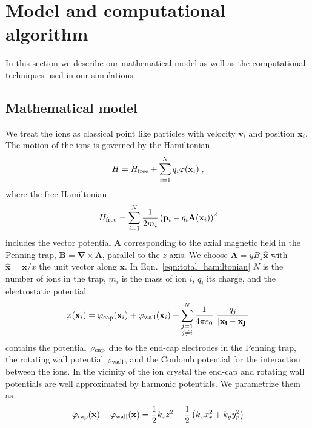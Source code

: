 \documentclass[aps, pra, preprint]{revtex4-1}
\newcommand{\hfree}{H_{\rm free}}
\newcommand{\phicap}{\varphi_{\rm cap}}
\newcommand{\phiwall}{\varphi_{\rm wall}}
\begin{document}
\section{Model and computational algorithm}
\label{sec:model}

In this section we describe our mathematical model as well as the
computational techniques used in our simulations.


\subsection{Mathematical model}

We treat the ions as classical point like particles with 
velocity $\mathbf{v}_i$ and position $\mathbf{x}_i$. The motion
of the ions is governed by the Hamiltonian
\begin{equation}
  H = \hfree + \sum_{i=1}^N q_i\varphi(\mathbf{x}_i)\;,
\end{equation}
where the free Hamiltonian
\begin{equation}
  \hfree =
  \sum_{i=1}^N \frac{1}{2m_i}\left(
    \mathbf{p}_i -
    q_i\mathbf{A}(\mathbf{x}_i) \right)^2 
  \label{eqn:total_hamiltonian}
\end{equation}
includes the vector potential $\mathbf{A}$ corresponding to the
axial magnetic field in the Penning trap, $\mathbf{B} =
\mathbf{\nabla}\times \mathbf{A}$, parallel to the $z$ axis. We
choose $\mathbf{A} = yB_z\mathbf{\hat x}$ with $\mathbf{\hat
  x}=\mathbf{x}/x$ the unit vector along $\mathbf{x}$. In
Eqn.~\eqref{eqn:total_hamiltonian} $N$ is the number of ions in
the trap, $m_i$ is the mass of ion $i$, $q_i$ its charge, and the
electrostatic potential
\begin{equation}
  \varphi(\mathbf{x}_i) =
  \phicap(\mathbf{x}_i) +
  \phiwall(\mathbf{x}_i) +
  \sum_{\substack{j=1\\j\neq i}}^N
  \frac{1}{4\pi\varepsilon_0}\
  \frac{q_j}{\left| \mathbf{x_i} - \mathbf{x_j} \right|}
\end{equation}
contains the potential $\phicap$ due to the end-cap electrodes in
the Penning trap, the rotating wall potential $\phiwall$, and the
Coulomb potential for the interaction between the ions. In the
vicinity of the ion crystal the end-cap and rotating wall
potentials are well approximated by harmonic potentials. We
parametrize them as
\begin{equation}
  \phicap(\mathbf{x}) +\phiwall(\mathbf{x}) =\frac{1}{2}k_z z^2 - 
\frac{1}{2} \left(k_x x_r^2 + k_y y_r^2\right)
\end{equation}
\end{document}
